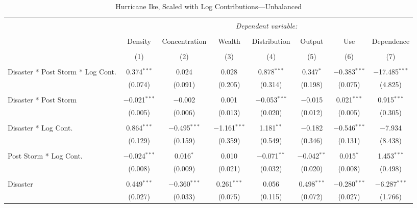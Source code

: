 
\begin{table}[!htbp] \centering 
  \caption{Hurricane Ike, Scaled with Log Contributions---Unbalanced} 
  \label{} 
\footnotesize 
\begin{tabular}{@{\extracolsep{5pt}}lccccccc} 
\\[-1.8ex]\hline 
\hline \\[-1.8ex] 
 & \multicolumn{7}{c}{\textit{Dependent variable:}} \\ 
\cline{2-8} 
\\[-1.8ex] & Density & Concentration & Wealth & Distribution & Output & Use & Dependence \\ 
\\[-1.8ex] & (1) & (2) & (3) & (4) & (5) & (6) & (7)\\ 
\hline \\[-1.8ex] 
 Disaster * Post Storm * Log Cont. & 0.374$^{***}$ & 0.024 & 0.028 & 0.878$^{***}$ & 0.347$^{*}$ & $-$0.383$^{***}$ & $-$17.485$^{***}$ \\ 
  & (0.074) & (0.091) & (0.205) & (0.314) & (0.198) & (0.075) & (4.825) \\ 
  & & & & & & & \\ 
 Disaster * Post Storm & $-$0.021$^{***}$ & $-$0.002 & 0.001 & $-$0.053$^{***}$ & $-$0.015 & 0.021$^{***}$ & 0.915$^{***}$ \\ 
  & (0.005) & (0.006) & (0.013) & (0.020) & (0.012) & (0.005) & (0.305) \\ 
  & & & & & & & \\ 
 Disaster * Log Cont. & 0.864$^{***}$ & $-$0.495$^{***}$ & $-$1.161$^{***}$ & 1.181$^{**}$ & $-$0.182 & $-$0.546$^{***}$ & $-$7.934 \\ 
  & (0.129) & (0.159) & (0.359) & (0.549) & (0.346) & (0.131) & (8.438) \\ 
  & & & & & & & \\ 
 Post Storm *  Log Cont. & $-$0.024$^{***}$ & 0.016$^{*}$ & 0.010 & $-$0.071$^{**}$ & $-$0.042$^{**}$ & 0.015$^{*}$ & 1.453$^{***}$ \\ 
  & (0.008) & (0.009) & (0.021) & (0.032) & (0.020) & (0.008) & (0.498) \\ 
  & & & & & & & \\ 
 Disaster & 0.449$^{***}$ & $-$0.360$^{***}$ & 0.261$^{***}$ & 0.056 & 0.498$^{***}$ & $-$0.280$^{***}$ & $-$6.287$^{***}$ \\ 
  & (0.027) & (0.033) & (0.075) & (0.115) & (0.072) & (0.027) & (1.766) \\ 

\end{tabular}
\end{table}
